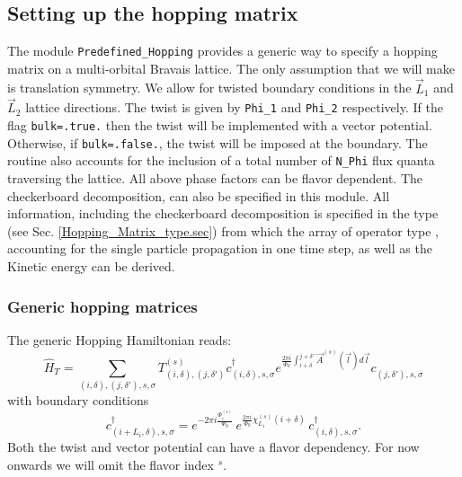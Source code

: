 %
\subsection{ Setting up the hopping matrix }

The module \texttt{Predefined\_Hopping}   provides a   generic way to   specify a  hopping matrix on a  multi-orbital   Bravais lattice.  The only  assumption that we will make is  translation symmetry.   We   allow  for twisted  boundary conditions in the $\vec{L}_1$ and $\vec{L}_2$ lattice directions. The twist is given by  \texttt{Phi\_1}  and \texttt{Phi\_2}  respectively.  If the flag  \texttt{bulk=.true.}   then   the twist will be implemented with a vector potential. Otherwise, if  \texttt{bulk=.false.}, the twist will be imposed at the boundary. The routine also accounts for  the inclusion of a  total number of \texttt{N\_Phi}  flux quanta traversing the lattice.   All above phase factors  can be flavor dependent.     The checkerboard decomposition, can also be specified in this module.      All information, including the checkerboard decomposition is specified in the     type (see Sec. \ref{Hopping_Matrix_type.sec}) from which  the array of  operator type ,   accounting for the single particle propagation in one time step,  as well as the Kinetic energy can be derived.    

\subsubsection{Generic hopping matrices}\label{sec:generic_hopping}

The generic Hopping Hamiltonian  reads: 
\begin{equation}
	   \hat{H}_T = \sum_{(i,\delta), (j,\delta'), s, \sigma}    T_{(i,\delta), (j,\delta')}^{(s)}    c^{\dagger}_{(i,\delta),s,\sigma }   e^{\frac{2 \pi i}{\Phi_0} \int_{i + \delta}^{j + \delta'}  \vec{A}^{(s)}(\vec{l})  d \vec{l}} c^{}_{(j,\delta'),s,\sigma }
\end{equation}
with boundary conditions 
\begin{equation}
	c^{\dagger}_{(i + L_i,\delta) ,s,\sigma }   =  e^{- 2 \pi i\frac{\Phi_i^{(s)}}{\Phi_0}} \, e^{\frac{2 \pi i }{\Phi_0} \chi^{(s)}_{L_1} ( i + \delta ) } \, c^{\dagger}_{(i,\delta) ,s,\sigma }.
\end{equation}
Both the twist and  vector  potential can have a flavor dependency. For  now onwards we will  omit the flavor index $^{s}$.  

